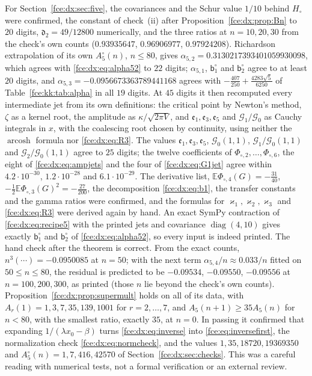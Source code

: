 \documentclass[11pt,a4paper]{article}
\numberwithin{equation}{section}
\theoremstyle{definition}\newtheorem{definition}[theorem]{Definition}
\theoremstyle{remark}\newtheorem{remark}[theorem]{Remark}
\newcommand{\Exp}{\mathbb E}
\begin{document}
For Section~\ref{fce:dx:sec:five}, the covariances and the Schur value
$1/10$ behind $H_\circ$ were confirmed, the constant of check~(ii) after
Proposition~\ref{fce:dx:prop:Bn} to $20$ digits, $\mathfrak d_2=49/12800$
numerically, and the three ratios at $n=10,20,30$ from the check's own
counts ($0.93935647$, $0.96906977$, $0.97924208$). Richardson extrapolation
of its own $A^\circ_5(n)$, $n\le80$, gives
$\alpha_{5,2}=0.3130217393401059930098$, which agrees with
\eqref{fce:dx:eq:alpha52} to $22$ digits; $\alpha_{5,1}$,
$\mathsf b^\circ_1$ and $\mathsf b^\circ_2$ agree to at least $20$ digits,
and $\alpha_{5,3}=-0.0956673363789441168$ agrees with
$-\frac{407}{250}+\frac{4283\sqrt5}{6250}$ of Table~\ref{fce:kk:tab:alpha} in
all $19$ digits. At $45$ digits it then recomputed every
intermediate jet from its own definitions: the critical point by Newton's
method, $\zeta$ as a kernel root, the amplitude as $\kappa/\sqrt{2\pi V}$,
and $\mathfrak e_1,\mathfrak e_3,\mathfrak e_5$ and
$\mathcal G_1/\mathcal G_0$ as Cauchy integrals in $x$, with the coalescing
root chosen by continuity, using neither the $\operatorname{arcosh}$ formula
nor \eqref{fce:dx:eq:R3}. The values $\mathfrak e_1,\mathfrak e_3,\mathfrak e_5$,
$\mathcal G_0(1,1)$, $\mathcal G_1/\mathcal G_0(1,1)$ and
$\mathcal G_2/\mathcal G_0(1,1)$ agree to $25$ digits; the twelve
coefficients of $\Phi_{\circ,2},\ldots,\Phi_{\circ,6}$, the eight of
\eqref{fce:dx:eq:ampjets} and the four of \eqref{fce:dx:eq:G1jet} agree
within $4.2\cdot10^{-30}$, $1.2\cdot10^{-28}$ and $6.1\cdot10^{-29}$. The
derivative list, $\Exp\Phi_{\circ,4}(G)=-\frac{31}{40}$,
$-\frac12\Exp\Phi_{\circ,3}(G)^2=-\frac{27}{200}$, the decomposition
\eqref{fce:dx:eq:b1}, the transfer constants and the gamma ratios were
confirmed, and the formulas for $\varkappa_1,\varkappa_2,\varkappa_3$ and
\eqref{fce:dx:eq:R3} were derived again by hand. An exact SymPy contraction
of \eqref{fce:dx:eq:recipe5} with the printed jets and covariance
$\operatorname{diag}(4,10)$ gives exactly $\mathsf b^\circ_1$ and
$\mathsf b^\circ_2$ of \eqref{fce:dx:eq:alpha52}, so every input is indeed
printed. The hand check after the theorem is correct. From the exact counts,
$n^3(\cdots)=-0.0950085$ at $n=50$; with the next term $\alpha_{5,4}/n\approx0.033/n$
fitted on $50\le n\le80$, the residual is predicted to be $-0.09534$,
$-0.09550$, $-0.09556$ at $n=100,200,300$, as printed (those $n$ lie beyond
the check's own counts). Proposition~\ref{fce:dx:prop:supermult} holds on all
of its data, with $A_r(1)=1,3,7,35,139,1001$ for $r=2,\ldots,7$, and
$A_5(n+1)\ge35A_5(n)$ for $n<80$, with the smallest ratio, exactly $35$, at
$n=0$. In passing it confirmed that expanding $1/(\lambda x_0-\beta)$ turns
\eqref{fce:dx:eq:inverse} into \eqref{fce:eq:inversefirst}, the normalization
check \eqref{fce:dx:eq:normcheck}, and the values $1,35,18720,19369350$ and
$A^\circ_5(n)=1,7,416,42570$ of Section~\ref{fce:dx:sec:checks}. This was a
careful reading with numerical tests, not a formal verification or an
external review.
\end{document}
